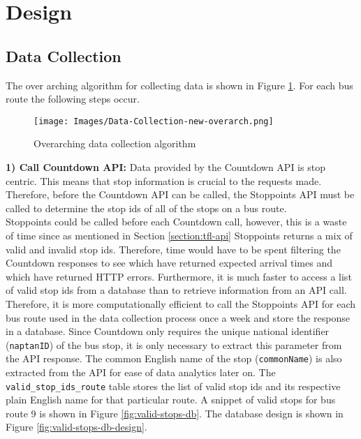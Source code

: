 \section{Design}

\subsection{Data Collection}

The over arching algorithm for collecting data is shown in Figure \ref{fig:main-flow}. For each bus route the following steps occur. \\

\begin{figure}[H]
\begin{center}
    \texttt{[image: Images/Data-Collection-new-overarch.png]}
    \caption{Overarching data collection algorithm}
    \label{fig:main-flow}
\end{center}
\end{figure}

\textbf{1) Call Countdown API:} Data provided by the Countdown API is stop centric. This means that stop information is crucial to the requests made. Therefore, before the Countdown API can be called, the Stoppoints API must be called to determine the stop ids of all of the stops on a bus route. \\ 

Stoppoints could be called before each Countdown call, however, this is a waste of time since as mentioned in Section \ref{section:tfl-api} Stoppoints returns a mix of valid and invalid stop ids. Therefore, time would have to be spent filtering the Countdown responses to see which have returned expected arrival times and which have returned HTTP errors. Furthermore, it is much faster to access a list of valid stop ids from a database than to retrieve information from an API call. \\

Therefore, it is more computationally efficient to call the Stoppoints API for each bus route used in the data collection process once a week and store the response in a database. Since Countdown only requires the unique national identifier (\texttt{naptanID}) of the bus stop, it is only necessary to extract this parameter from the API response. The common English name of the stop (\texttt{commonName}) is also extracted from the API for ease of data analytics later on. The  \texttt{valid\_stop\_ids\_route} table stores the list of valid stop ids and its respective plain English name for that particular route. A snippet of valid stops for bus route 9 is shown in Figure \ref{fig:valid-stops-db}. The database design is shown in Figure \ref{fig:valid-stops-db-design}. \\

